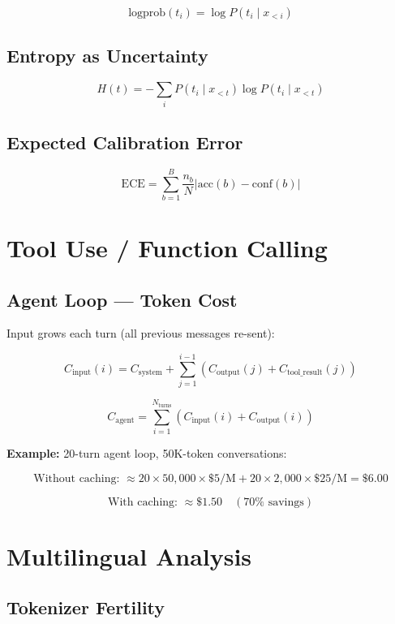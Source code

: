 \documentclass[11pt,a4paper]{article}
\begin{document}
$$\text{logprob}(t_i) = \log P(t_i \mid x_{<i})$$

\subsection{Entropy as Uncertainty}

$$H(t) = -\sum_i P(t_i \mid x_{<t}) \log P(t_i \mid x_{<t})$$

\subsection{Expected Calibration Error}

$$\text{ECE} = \sum_{b=1}^{B} \frac{n_b}{N} \left|\text{acc}(b) - \text{conf}(b)\right|$$

\section{Tool Use / Function Calling}

\subsection{Agent Loop --- Token Cost}

Input grows each turn (all previous messages re-sent):

$$C_{\text{input}}(i) = C_{\text{system}} + \sum_{j=1}^{i-1} \left(C_{\text{output}}(j) + C_{\text{tool\_result}}(j)\right)$$

$$C_{\text{agent}} = \sum_{i=1}^{N_{\text{turns}}} \left(C_{\text{input}}(i) + C_{\text{output}}(i)\right)$$

\textbf{Example:} 20-turn agent loop, 50K-token conversations:

$$\text{Without caching: } \approx 20 \times 50{,}000 \times \$5/\text{M} + 20 \times 2{,}000 \times \$25/\text{M} = \$6.00$$

$$\text{With caching: } \approx \$1.50 \quad (70\% \text{ savings})$$

\section{Multilingual Analysis}

\subsection{Tokenizer Fertility}
\end{document}
